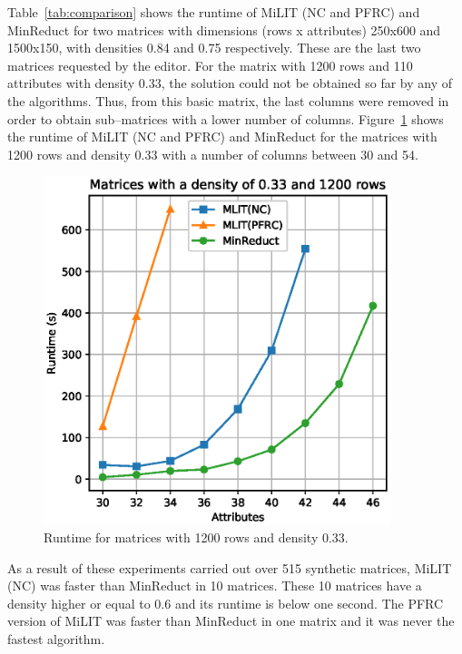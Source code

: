 \documentclass[citenumber]{llncs}
\begin{document}
	Table~\ref{tab:comparison} shows the runtime of MiLIT (NC and PFRC) and MinReduct for two matrices with dimensions (rows x attributes) 250x600 and 1500x150, with densities 0.84 and 0.75 respectively. These are the last two matrices requested by the editor. For the matrix with 1200 rows and 110 attributes with density 0.33, the solution could not be obtained so far by any of the algorithms. Thus, from this basic matrix, the last columns were removed in order to obtain sub--matrices with a lower number of columns. Figure~\ref{fig:1200x110}  shows the runtime of MiLIT (NC and PFRC) and MinReduct for the matrices with 1200 rows and density 0.33 with a number of columns between 30 and 54. 
	
	\begin{figure}[hbt]
		\begin{center}
			\includegraphics[height=4in]{low_density_Minreduct_vs_MLIT.eps} 
		\end{center}
		\caption{Runtime for matrices with 1200 rows and density 0.33.}\label{fig:1200x110}
	\end{figure}  
	
	As a result of these experiments carried out over 515 synthetic matrices,  MiLIT (NC) was faster than MinReduct in 10 matrices. These 10 matrices have a density higher or equal to 0.6 and its runtime is below one second. The PFRC version of MiLIT was faster than MinReduct in one matrix and it was never the fastest algorithm. 
	
\end{document}
